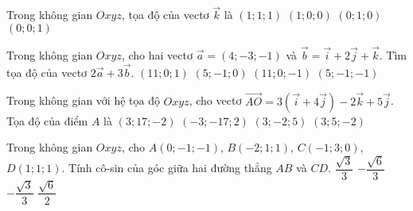 \begin{ex}%
	Trong không gian $Oxyz$, tọa độ của vectơ $\vec{k}$ là
	\choice
	{$(1;1;1)$}
	{$(1;0;0)$}
	{$(0;1;0)$}
	{\True $(0;0;1)$}
\end{ex}

\begin{ex}%
	Trong không gian $Oxyz$, cho hai vectơ $\overrightarrow{a}=(4;-3;-1)$ và $\overrightarrow{b}=\overrightarrow{i}+2\overrightarrow{j}+\overrightarrow{k}$. Tìm tọa độ của vectơ $2\overrightarrow{a}+3\overrightarrow{b}$.
	\choice
	{\True $(11;0;1)$}
	{$(5;-1;0)$}
	{$(11;0;-1)$}
	{$(5;-1;-1)$}
\end{ex}

\begin{ex}%
	Trong không gian với hệ tọa độ $Oxyz$, cho vectơ $\overrightarrow{A O}=3\left(\overrightarrow{i}+4 \overrightarrow{j}\right)-2 \overrightarrow{k}+5\overrightarrow{j}$. Tọa độ của điểm $A$ là
	\choice
	{$(3;17;-2)$}
	{\True $(-3;-17;2)$}
	{$(3;-2;5)$}
	{$(3;5;-2)$}
\end{ex}

\begin{ex}%
	Trong không gian $Oxyz$, cho $A(0;-1;-1)$, $B(-2;1;1)$, $C(-1;3;0)$, $D(1;1;1)$. Tính cô-sin của góc giữa hai đường thẳng $AB$ và $CD$.
	\choice
	{\True $\dfrac{\sqrt{3}}{3}$}
	{$-\dfrac{\sqrt{6}}{3}$}
	{$-\dfrac{\sqrt{3}}{3}$}
	{$\dfrac{\sqrt{6}}{2}$}
\end{ex}

